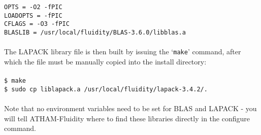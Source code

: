 \documentclass[10pt,a4paper]{article}
\newcommand\tab[1][0.5cm]{\hspace*{#1}}
\begin{document}
\tab \texttt{OPTS = -O2 -fPIC}\\
\tab \texttt{LOADOPTS = -fPIC}\\
\tab \texttt{CFLAGS = -O3 -fPIC}\\
\tab \texttt{BLASLIB = /usr/local/fluidity/BLAS-3.6.0/libblas.a}\\\\
The LAPACK library file is then built by issuing the `\texttt{make}' command, after which the file must be manually copied into the install directory:\\\\
\tab \texttt{\$ make}\\
\tab \texttt{\$ sudo cp liblapack.a /usr/local/fluidity/lapack-3.4.2/.}\\\\
Note that no environment variables need to be set for BLAS and LAPACK - you will tell ATHAM-Fluidity where to find these libraries directly in the configure command.
\end{document}
